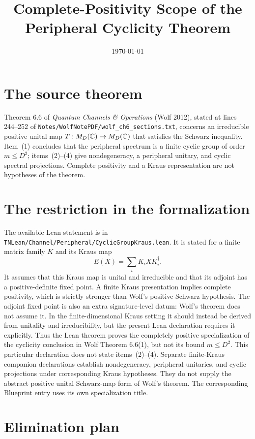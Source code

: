 \documentclass[11pt]{article}
\title{Complete-Positivity Scope of the Peripheral Cyclicity Theorem}
\author{}
\date{\today}
\begin{document}
\maketitle
{}

\section{The source theorem}

Theorem 6.6 of \emph{Quantum Channels \& Operations} (Wolf 2012), stated at
lines 244--252 of \texttt{Notes/WolfNotePDF/wolf\_ch6\_sections.txt}, concerns
an irreducible positive unital map $T:M_{D}(\mathbb{C})\to M_{D}(\mathbb{C})$ that
satisfies the Schwarz inequality. Item~(1) concludes that the peripheral
spectrum is a finite cyclic group of order $m\leq D^2$; items~(2)--(4) give
nondegeneracy, a peripheral unitary, and cyclic spectral projections.
Complete positivity and a Kraus representation are not hypotheses of the
theorem.

\section{The restriction in the formalization}

The available Lean statement is
 in
\texttt{TNLean/Channel/Peripheral/CyclicGroupKraus.lean}. It is stated for a finite
matrix family $K$ and its Kraus map
\[
    E(X)=\sum_i K_iXK_i^\dagger.
\]
It assumes that this Kraus map is unital and irreducible and that its adjoint
has a positive-definite fixed point. A finite Kraus presentation implies
complete positivity, which is strictly stronger than Wolf's positive Schwarz
hypothesis. The adjoint fixed point is also an extra signature-level datum:
Wolf's theorem does not assume it. In the finite-dimensional Kraus setting it
should instead be derived from unitality and irreducibility, but the present
Lean declaration requires it explicitly. Thus the Lean theorem proves the
completely positive specialization of the cyclicity conclusion in Wolf
Theorem 6.6(1), but not its bound $m\leq D^2$. This particular declaration does
not state items~(2)--(4). Separate finite-Kraus companion declarations establish
nondegeneracy, peripheral unitaries, and cyclic projections under corresponding
Kraus hypotheses. They do not supply the abstract positive unital Schwarz-map
form of Wolf's theorem. The corresponding Blueprint entry uses its own
specialization title.

\section{Elimination plan}
\end{document}
